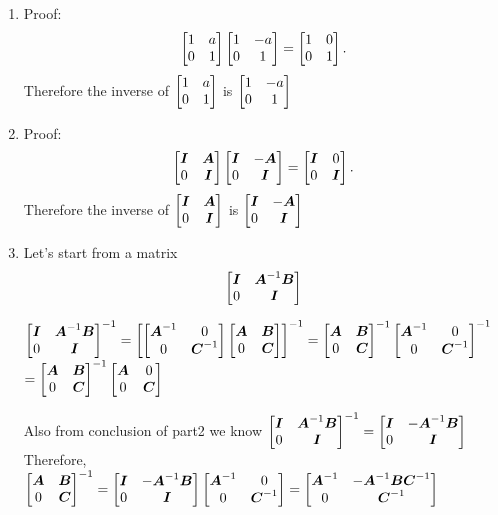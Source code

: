 \documentclass{article}
\begin{document}
\begin{enumerate}
\item Proof: \newline
\begin{displaymath}
\bmat{ 1 & a \\ 0 & 1 }
\bmat{ 1 & -a \\ 0 & 1 } =\bmat{ 1 & 0 \\ 0 & 1 } .
\end{displaymath}
Therefore the inverse of  $\bmat{ 1 & a \\ 0 & 1 }$ is $\bmat{ 1 & -a \\ 0 & 1 }$

\item Proof: \newline
\begin{displaymath}
\bmat{ \mI & \mA \\ 0 & \mI }
\bmat{ \mI  & -\mA  \\ 0 & \mI  } = \bmat{ \mI  & 0  \\ 0 & \mI  }.
\end{displaymath}
Therefore the inverse of  $\bmat{ \mI & \mA \\ 0 & \mI }$ is $\bmat{ \mI  & -\mA  \\ 0 & \mI  } $

\item 
Let's start from a matrix 
\begin{displaymath} 
\bmat{\mI & \mA^{-1}\mB \\0 & \mI} 
\end{displaymath}

$\bmat{\mI & \mA^{-1}\mB \\0 & \mI}^{-1} =  \bmat{\bmat{\mA^{-1} & 0 \\ 0 & \mC^{-1}}\bmat{\mA & \mB \\ 0 & \mC}}^{-1}= \bmat{\mA & \mB \\ 0 & \mC}^{-1}\bmat{\mA^{-1} & 0 \\ 0 & \mC^{-1}}^{-1} $ \newline 
$=\bmat{\mA & \mB \\ 0 & \mC}^{-1}\bmat{\mA & 0 \\ 0 & \mC}$  \newline

Also from conclusion of part2 we know \newline 
$\bmat{\mI & \mA^{-1}\mB \\0 & \mI}^{-1} = \bmat{\mI & -\mA^{-1}\mB \\0 & \mI}$ \newline 
Therefore, \newline 
$\bmat{\mA & \mB \\ 0 & \mC}^{-1} = \bmat{\mI & -\mA^{-1}\mB \\0 & \mI}\bmat{\mA^{-1} & 0 \\ 0 & \mC^{-1}} = \bmat{\mA^{-1} & -\mA^{-1}\mB\mC^{-1} \\ 0 & \mC^{-1}}$
\end{enumerate}
\end{document}
